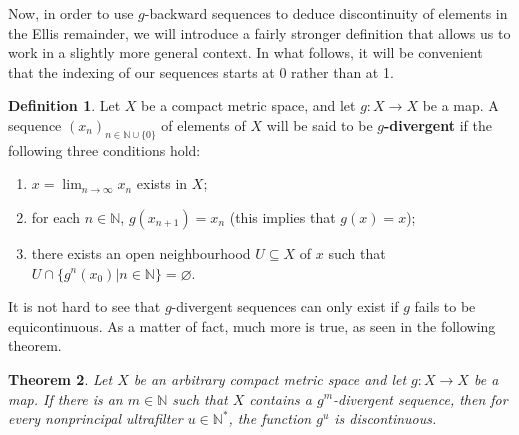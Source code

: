 \documentclass[12pt]{amsart}
\newtheorem{theorem}{Theorem}[section]
\theoremstyle{definition}
\newtheorem{definition}[theorem]{Definition}
\numberwithin{equation}{section}
\begin{document}
Now, in order to use $g$-backward sequences to deduce discontinuity of elements in the Ellis remainder, we will introduce a fairly stronger definition that allows us to work in a slightly more general context. In what follows, it will be convenient that the indexing of our sequences starts at 0 rather than at 1.

\begin{definition}
Let $X$ be a compact metric space, and let $g \colon X\longrightarrow X$ be a map. A sequence 
$(x_n)_{n\in\mathbb N\cup\{0\}}$ of elements of $X$ will be said to be {\bf $g$-divergent} if the following three conditions hold:
\begin{enumerate}
\item $x=\lim_{n\to\infty}x_n$ exists in $X$;
\item for each $n\in\mathbb N$, $g(x_{n+1})=x_n$ (this implies that $g(x)=x$);
\item there exists an open neighbourhood $U\subseteq X$ of $x$ such that $U\cap\{g^n(x_0)\big|n\in\mathbb N\}
         =\varnothing$.
\end{enumerate}
\end{definition}

It is not hard to see that $g$-divergent sequences can only exist if $g$ fails to be equicontinuous. As a matter of 
fact, much more is true, as seen in the following theorem.

\begin{theorem}\label{discontinuity}
Let $X$ be an arbitrary compact metric space and let $g \colon X\longrightarrow X$ be a map. If 
there is an $m\in\mathbb N$ such that $X$ contains a $g^m$-divergent sequence, then for every nonprincipal ultrafilter $u\in\mathbb N^*$, the function $g^u$ is discontinuous.
\end{theorem}
\end{document}

